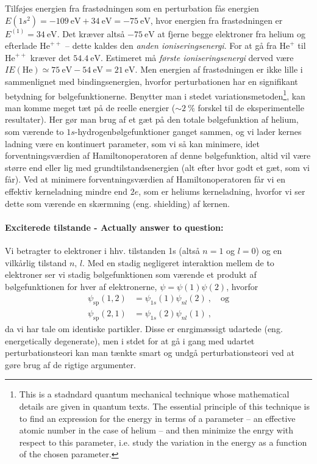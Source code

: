 Tilføjes energien fra frastødningen som en perturbation fås energien $E(1s^2) =  \SI{-109}{\eV} + \SI{34}{\eV} = \SI{-75}{\eV}$, hvor energien fra frastødningen er $E^{(1)} = \SI{34}{\eV}$. Det kræver altså $\SI{-75}{\eV}$ at fjerne begge elektroner fra helium og efterlade $\text{He}^{++}$ -- dette kaldes den \emph{anden ioniseringsenergi}. For at gå fra $\text{He}^{+}$ til $\text{He}^{++}$ kræver det $\SI{54.4}{\eV}$. Estimeret må \emph{første ioniseringsenergi} derved være $IE(\text{He}) \simeq \SI{75}{\eV} - \SI{54}{\eV} = \SI{21}{\eV}$. Men energien af frastødningen er ikke lille i sammenlignet med bindingsenergien, hvorfor perturbationen har en signifikant betydning for bølgefunktionerne. Benytter man i stedet variationsmetoden\footnote{This is a stadndard quantum mechanical technique whose mathematical details are given in quantum texts. The essential principle of this technique is to find an expression for the energy in terms of a parameter -- an effective atomic number in the case of helium -- and then minimize the enrgy with respect to this parameter, i.e. study the variation in the energy as a function of the chosen parameter.}, kan man komme meget tæt på de reelle energier ($\sim\SI{2}{\percent}$ forskel til de eksperimentelle resultater). Her gør man brug af et gæt på den totale bølgefunktion af helium, som værende to $1s$-hydrogenbølgefunktioner ganget sammen, og vi lader kernes ladning være en kontinuert parameter, som vi så kan minimere, idet forventningsværdien af Hamiltonoperatoren af denne bølgefunktion, altid vil være større end eller lig med grundtilstandsenergien (alt efter hvor godt et gæt, som vi får). Ved at minimere forventningsværdien af Hamiltonoperatoren får vi en effektiv kerneladning mindre end $2e$, som er heliums kerneladning, hvorfor vi ser dette som værende en skærmning (eng. shielding) af kernen.\\



\paragraph{Exciterede tilstande - Actually answer to question:} Vi betragter to elektroner i hhv. tilstanden 1s (altså $n=1$ og $l=0$) og en vilkårlig tilstand $n,\,l$. Med en stadig negligeret interaktion mellem de to elektroner ser vi stadig bølgefunktionen som værende et produkt af bølgefunktionen for hver af elektronerne, $\psi = \psi(1)\psi(2)$, hvorfor
\begin{align}
    \psi_\text{sp}(1,2) &= \psi_{1s}(1)\psi_{nl}(2) \: , \quad \text{og} \\
    \psi_\text{sp}(2,1) &= \psi_{1s}(2)\psi_{nl}(1) \: ,
\end{align}
da vi har tale om identiske partikler. Disse er enrgimæssigt udartede (eng. energetically degenerate), men i stdet for at gå i gang med udartet perturbationsteori kan man tænkte smart og undgå perturbationsteori ved at gøre brug af de rigtige argumenter.

